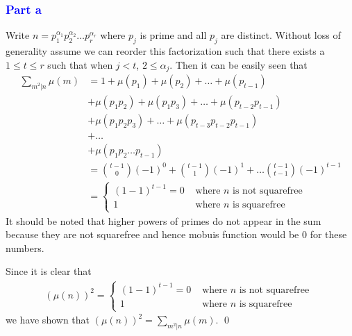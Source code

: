 \documentclass{unswmaths}
\begin{document}
\subsubsection*{\textcolor{blue}{Part a}}
Write $ n = p_1^{\alpha_1} p_2^{\alpha_2} \ldots p_r^{\alpha_r} $ where $ p_j $ 
is prime and all $ p_j $ are distinct.
Without loss of generality assume we can reorder this factorization such that 
there exists a $ 1 \leq t \leq r $ such that
when $ j < t $, $ 2 \leq \alpha_j $.
Then it can be easily seen that
\begin{align*}
    \sum_{m^2 | n } \mu(m) &= 1 + \mu(p_1) + \mu(p_2) + \ldots + \mu(p_{t-1}) \\
        &+ \mu(p_1 p_2) + \mu(p_1 p_3) + \ldots + \mu(p_{t-2} p_{t-1}) \\
        &+ \mu(p_1 p_2 p_3) + \ldots + \mu( p_{t-3} p_{t-2} p_{t-1}) \\
        &+ \ldots \\
        &+ \mu(p_1 p_2 \ldots p_{t-1}) \\
        &=  \binom{t-1}{0}(-1)^{0} + \binom{t-1}{1} (-1)^{1} + \ldots  \binom{t-1}{t-1}(-1)^{t-1} \\
        &= \begin{cases}
               (1-1)^{t-1} = 0 & \text{ where } n \text{ is not squarefree } \\
               1 & \text{ where } n \text{ is squarefree }
           \end{cases}
\end{align*}
It should be noted that higher powers of primes do not appear in the sum
because they are not squarefree and hence mobuis function would be $ 0 $ 
for these numbers.

Since it is clear that 
\begin{align*}
    (\mu(n))^2 = \begin{cases}
        (1-1)^{t-1} = 0 & \text{ where } n \text{ is not squarefree } \\
        1 & \text{ where } n \text{ is squarefree }
    \end{cases}
\end{align*}
we have shown that $ (\mu(n))^2 = \sum_{m^2 | n} \mu(m) $. \qed
\end{document}
